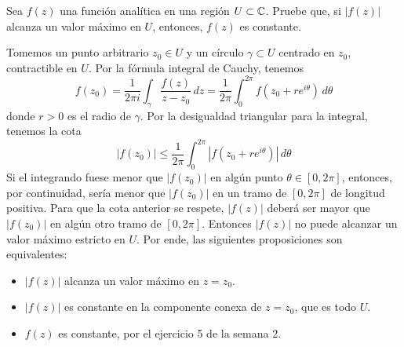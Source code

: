 \begin{exercise}
Sea $f(z)$ una función analítica en una región $U \subset \mathbb C$. Pruebe que, si $|f(z)|$ alcanza un valor máximo en $U$, entonces, $f(z)$ es constante.
\end{exercise}

\begin{solution}
Tomemos un punto arbitrario $z_0 \in U$ y un círculo $\gamma \subset U$ centrado en $z_0$, contractible en $U$. Por la fórmula integral de Cauchy, tenemos
$$
f(z_0)
    = \frac 1 {2\pi i} \int_\gamma \frac {f(z)} {z - z_0} \, dz
    = \frac 1 {2\pi} \int_0^{2\pi} f(z_0 + re^{i\theta}) \, d\theta
$$
donde $r > 0$ es el radio de $\gamma$. Por la desigualdad triangular para la integral, tenemos la cota
$$|f(z_0)| \le \frac 1 {2\pi} \int_0^{2\pi} |f(z_0 + re^{i\theta})| \, d\theta$$
Si el integrando fuese menor que $|f(z_0)|$ en algún punto $\theta \in [0, 2\pi]$, entonces, por continuidad, sería menor que $|f(z_0)|$ en un tramo de $[0, 2\pi]$ de longitud positiva. Para que la cota anterior se respete, $|f(z)|$ deberá ser mayor que $|f(z_0)|$ en algún otro tramo de $[0, 2\pi]$. Entonces $|f(z)|$ no puede alcanzar un valor máximo estricto en $U$. Por ende, las siguientes proposiciones son equivalentes:
\begin{itemize}
    \item $|f(z)|$ alcanza un valor máximo en $z = z_0$.
    \item $|f(z)|$ es constante en la componente conexa de $z = z_0$, que es todo $U$.
    \item $f(z)$ es constante, por el ejercicio 5 de la semana 2.
\end{itemize}
\end{solution}

\newpage
